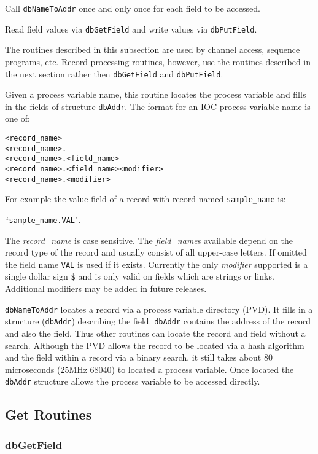 Call \verb|dbNameToAddr| once and only once for each field to be accessed.

Read field values via \verb|dbGetField| and write values via \verb|dbPutField|.

The routines described in this subsection are used by channel access, sequence programs, etc. Record processing routines, 
however, use the routines described in the next section rather then \verb|dbGetField| and \verb|dbPutField|.

Given a process variable name, this routine locates the process variable and fills in the fields of structure \verb|dbAddr|. The 
format for an IOC process variable name is one of:

\begin{verbatim}<record_name>
<record_name>.
<record_name>.<field_name>
<record_name>.<field_name><modifier>
<record_name>.<modifier>
\end{verbatim}For example the value field of a record with record named \verb|sample_name| is:

       ``\verb|sample_name.VAL|".

The \emph{record\_name} is case sensitive. The \emph{field\_name}s available depend on the record type of the record and usually consist 
of all upper-case letters. If omitted the field name \verb|VAL| is used if it exists. Currently the only \emph{modifier} supported is a single 
dollar sign \verb|$| and is only valid on fields which are strings or links. Additional modifiers may be added in future releases.

\verb|dbNameToAddr| locates a record via a process variable directory (PVD). It fills in a structure (\verb|dbAddr|) describing the 
field. \verb|dbAddr| contains the address of the record and also the field. Thus other routines can locate the record and field 
without a search. Although the PVD allows the record to be located via a hash algorithm and the field within a record via 
a binary search, it still takes about 80 microseconds (25MHz 68040) to located a process variable. Once located the 
\verb|dbAddr| structure allows the process variable to be accessed directly.

\subsection{Get Routines}

\subsubsection{dbGetField}

